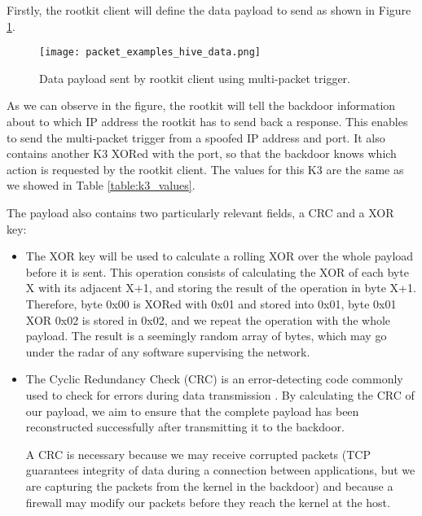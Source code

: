 Firstly, the rootkit client will define the data payload to send as shown in Figure \ref{fig:hive_data}.

\begin{figure}[htbp]
	\centering
	\texttt{[image: packet\_examples\_hive\_data.png]}
	\caption{Data payload sent by rootkit client using multi-packet trigger.}
	\label{fig:hive_data}
\end{figure}

As we can observe in the figure, the rootkit will tell the backdoor information about to which IP address the rootkit has to send back a response. This enables to send the multi-packet trigger from a spoofed IP address and port. It also contains another K3 XORed with the port, so that the backdoor knows which action is requested by the rootkit client. The values for this K3 are the same as we showed in Table \ref{table:k3_values}.

The payload also contains two particularly relevant fields, a CRC and a XOR key:
\begin{itemize}
\item The XOR key will be used to calculate a rolling XOR over the whole payload before it is sent. This operation consists of calculating the XOR of each byte X with its adjacent X+1, and storing the result of the operation in byte X+1. Therefore, byte 0x00 is XORed with 0x01 and stored into 0x01, byte 0x01 XOR 0x02 is stored in 0x02, and we repeat the operation with the whole payload. The result is a seemingly random array of bytes, which may go under the radar of any software supervising the network.
\item The Cyclic Redundancy Check (CRC) is an error-detecting code commonly used to check for errors during data transmission \cite{crc}. By calculating the CRC of our payload, we aim to ensure that the complete payload has been reconstructed successfully after transmitting it to the backdoor.

A CRC is necessary because we may receive corrupted packets (TCP guarantees integrity of data during a connection between applications, but we are capturing the packets from the kernel in the backdoor) and because a firewall may modify our packets before they reach the kernel at the host.
\end{itemize}

